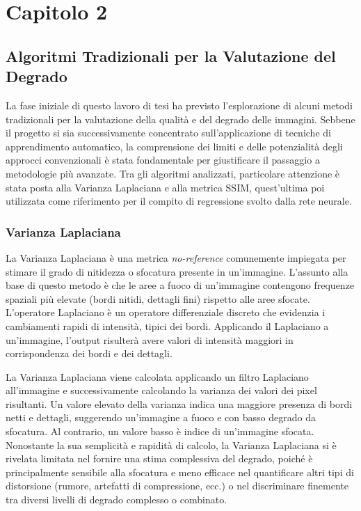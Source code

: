 %
%
\chapter{Capitolo 2}
\label{chap:strumenti}
\section{Algoritmi Tradizionali per la Valutazione del Degrado}

La fase iniziale di questo lavoro di tesi ha previsto l'esplorazione di alcuni metodi tradizionali per la valutazione della qualità e del degrado delle immagini. Sebbene il progetto si sia successivamente concentrato sull'applicazione di tecniche di apprendimento automatico, la comprensione dei limiti e delle potenzialità degli approcci convenzionali è stata fondamentale per giustificare il passaggio a metodologie più avanzate. Tra gli algoritmi analizzati, particolare attenzione è stata posta alla Varianza Laplaciana e alla metrica SSIM, quest'ultima poi utilizzata come riferimento per il compito di regressione svolto dalla rete neurale.

\subsection{Varianza Laplaciana}

La Varianza Laplaciana è una metrica \textit{no-reference} comunemente impiegata per stimare il grado di nitidezza o sfocatura presente in un'immagine. L'assunto alla base di questo metodo è che le aree a fuoco di un'immagine contengono frequenze spaziali più elevate (bordi nitidi, dettagli fini) rispetto alle aree sfocate. L'operatore Laplaciano è un operatore differenziale discreto che evidenzia i cambiamenti rapidi di intensità, tipici dei bordi. Applicando il Laplaciano a un'immagine, l'output risulterà avere valori di intensità maggiori in corrispondenza dei bordi e dei dettagli.

La Varianza Laplaciana viene calcolata applicando un filtro Laplaciano all'immagine e successivamente calcolando la varianza dei valori dei pixel risultanti. Un valore elevato della varianza indica una maggiore presenza di bordi netti e dettagli, suggerendo un'immagine a fuoco e con basso degrado da sfocatura. Al contrario, un valore basso è indice di un'immagine sfocata. Nonostante la sua semplicità e rapidità di calcolo, la Varianza Laplaciana si è rivelata limitata nel fornire una stima complessiva del degrado, poiché è principalmente sensibile alla sfocatura e meno efficace nel quantificare altri tipi di distorsione (rumore, artefatti di compressione, ecc.) o nel discriminare finemente tra diversi livelli di degrado complesso o combinato.

